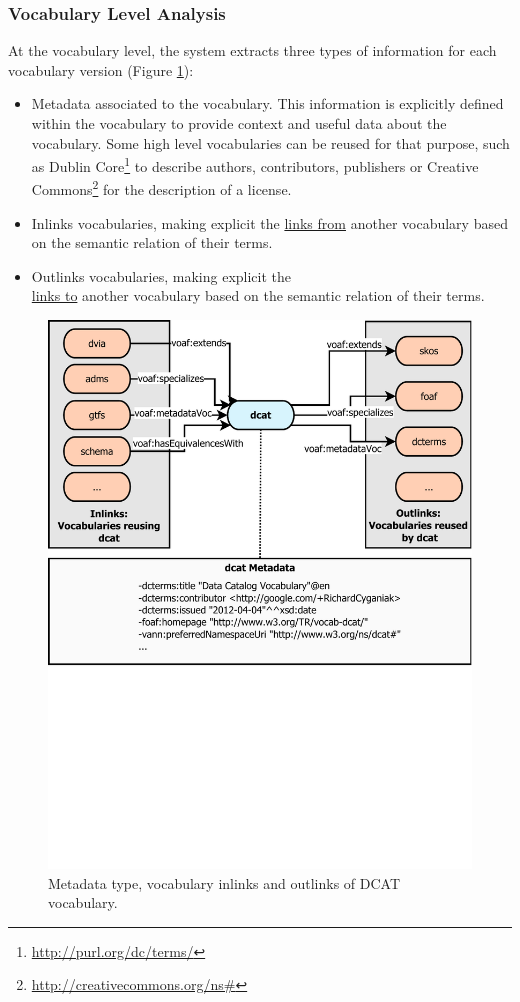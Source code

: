 \documentclass{iosart2c}
\begin{document}
\subsubsection{Vocabulary Level Analysis}
At the vocabulary level, the system extracts three types of information for each vocabulary version (Figure \ref{fig:dcat}):
\begin{itemize}
\item Metadata associated to the vocabulary. This information is explicitly defined within the vocabulary to provide context and useful data about the vocabulary. Some high level vocabularies can be reused for that purpose, such as Dublin Core\footnote{\url{http://purl.org/dc/terms/}} to describe authors, contributors, publishers or Creative Commons\footnote{\url{http://creativecommons.org/ns\#}} for the description of a license.

\item Inlinks vocabularies, making explicit the \underline{links from} another vocabulary based on the semantic relation of their terms.

\item Outlinks vocabularies, making explicit the\\ \underline{links to} another vocabulary based on the semantic relation of their terms.
\end{itemize}

\begin{figure}[ht!b]
\includegraphics[trim={0cm 10cm 0cm 0cm},width=1\textwidth]{FlowCharts/DCAT.pdf}
\caption{Metadata type, vocabulary inlinks and outlinks of DCAT vocabulary.}
\label{fig:dcat}
\end{figure}
\end{document}
